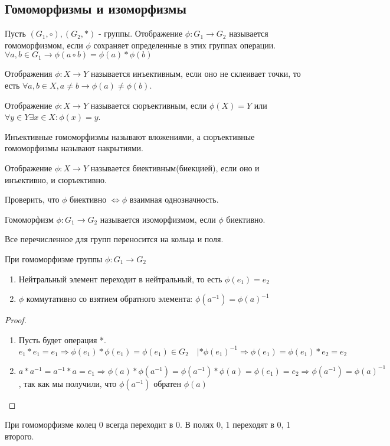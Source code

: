 \subsection{Гомоморфизмы и изоморфизмы}

\begin{definition}
	Пусть \((G_1, \circ), (G_2, *)\) - группы. Отображение \(\phi: G_1\to G_2\) называется гомоморфизмом, если $\phi$ сохраняет определенные в этих группах операции. \(\forall a,b\in G_1 \longrightarrow \phi(a\circ b) = \phi(a)*\phi(b)\)
\end{definition}
\begin{definition}
	Отображения $\phi: X\to Y$ называется инъективным, если оно не склеивает точки, то есть  \(\forall a, b\in X, a\ne b\longrightarrow \phi(a)\ne\phi(b)\).
\end{definition}
\begin{definition}
	Отображение $\phi:X\to Y$ называется сюръективным, если \(\phi(X) = Y\) или \(\forall y\in Y \exists x\in X: \phi(x) = y\).
\end{definition}
Инъективные гомоморфизмы называют вложениями, а сюръективные гомоморфизмы называют накрытиями.
\begin{definition}
	Отображение \(\phi: X\to Y\) называется биективным(биекцией), если оно и инъективно, и сюръективно.
\end{definition}
\begin{exercise}
	Проверить, что $\phi$ биективно $\Longleftrightarrow \phi$ взаимная однозначность.
\end{exercise}
\begin{definition}
	Гомоморфизм \(\phi: G_1\to G_2\) называется изоморфизмом, если $\phi$ биективно.
\end{definition}
Все перечисленное для групп переносится на кольца и поля.

\begin{proposition}
	При гомоморфизме группы $\phi:G_1\to G_2$
	\begin{enumerate}
		\item Нейтральный элемент переходит в нейтральный, то есть $\phi(e_1) = e_2$
		\item $\phi$ коммутативно со взятием обратного элемента: \(\phi(a^{-1}) = \phi(a)^{-1}\)
	\end{enumerate}
\end{proposition}
\begin{proof}
	\begin{enumerate}
		\item Пусть будет операция *. \(e_1* e_1 = e_1 \Longrightarrow \phi(e_1)*\phi(e_1) = \phi(e_1)\in G_2 \quad|* \phi(e_1)^{-1} \Longrightarrow \phi(e_1) = \phi(e_1)* e_2 = e_2\)
		\item \(a*a^{-1} = a^{-1}*a = e_1 \Longrightarrow \phi(a)*\phi(a^{-1}) = \phi(a^{-1})*\phi(a) = \phi(e_1) = e_2 \Longrightarrow \phi(a^{-1}) = \phi(a)^{-1}\), так как мы получили, что \(\phi(a^{-1})\) обратен \(\phi(a)\)
	\end{enumerate}
\end{proof}
\begin{corollary}
	При гомоморфизме колец 0 всегда переходит в 0. В полях 0, 1 переходят в 0, 1 второго.
\end{corollary}
